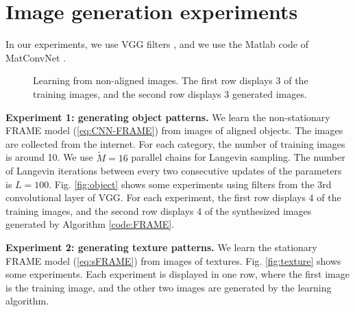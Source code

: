\documentclass[letterpaper]{article}
\begin{document}
\section{Image generation experiments}

In our experiments, we use VGG filters \citep{simonyan2014very}, and we use the Matlab code of MatConvNet \citep{matconvnn}.


\begin{figure}
	\centering
	\setlength{\fboxrule}{1pt}
	\setlength{\fboxsep}{0cm}	
		\caption{Learning from non-aligned images.  
		The first row displays 3 of the training images, and the second row displays 3 generated images.  }
	\label{fig:nonalign2}
\end{figure}

{\bf Experiment 1: generating object patterns.} We  learn the non-stationary FRAME model (\ref{eq:CNN-FRAME}) from  images of aligned objects. The images are collected from the internet. For each category, the number of training images is around 10. We use $\tilde{M} = 16$  parallel chains for Langevin sampling. The number of Langevin iterations between every two consecutive updates of the parameters is $L = 100$.  Fig. \ref{fig:object} shows some experiments using filters from the 3rd convolutional layer of VGG.  For each experiment, the first row displays 4 of the training images, and the second row displays 4 of the synthesized images generated by Algorithm \ref{code:FRAME}.

{\bf Experiment 2: generating texture patterns.} We  learn the stationary FRAME model (\ref{eq:sFRAME}) from images of textures. Fig. \ref{fig:texture} shows some experiments. Each experiment is displayed in one row, where the first image is the training image, and the other two images are generated by the learning algorithm. 
\end{document}
